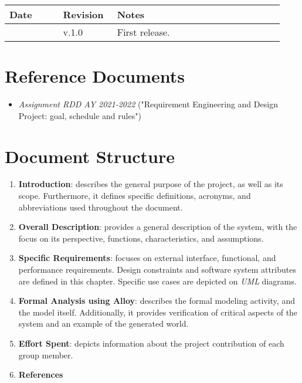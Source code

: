 \begin{center}
	\begin{tabular}{@{}p{0.18\linewidth} p{0.18\linewidth} p{0.57\linewidth}@{}}
		\toprule
		\textbf{Date} & \textbf{Revision} & \textbf{Notes}\\
		\midrule
		\date{} & v.1.0 & First release.\\
		\bottomrule
	\end{tabular}
\end{center}

\section{Reference Documents}

\begin{itemize}
    \item \textit{Assignment RDD AY 2021-2022} ("Requirement Engineering and Design Project: goal, schedule and rules")
\end{itemize}

\section{Document Structure}

\begin{enumerate}
    \item \textbf{Introduction}: describes the general purpose of the project, as well as its scope. Furthermore, it defines specific definitions, acronyms, and abbreviations used throughout the document.
    \item \textbf{Overall Description}: provides a general description of the system, with the focus on its perspective, functions, characteristics, and assumptions.
    \item \textbf{Specific Requirements}: focuses on external interface, functional, and performance requirements. Design constraints and software system attributes are defined in this chapter. Specific use cases are depicted on \textit{UML} diagrams.
    \item \textbf{Formal Analysis using Alloy}: describes the formal modeling activity, and the model itself. Additionally, it provides verification of critical aspects of the system and an example of the generated world.
    \item \textbf{Effort Spent}: depicts information about the project contribution of each group member.
    \item \textbf{References}
\end{enumerate}
